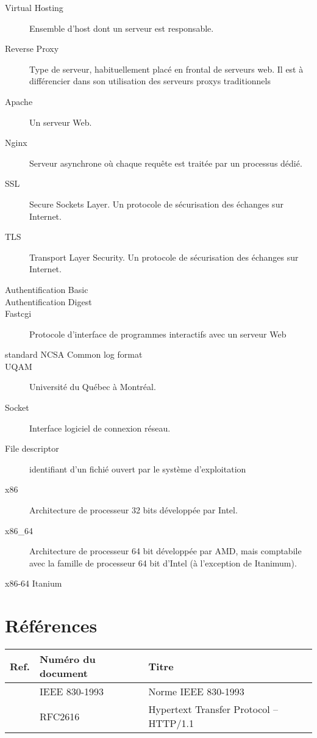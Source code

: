 \documentclass{scrreprt}
\begin{document}
\begin{description}
    \item[Virtual Hosting] Ensemble d'host dont un serveur est responsable.
    \item[Reverse Proxy] Type de serveur, habituellement placé en frontal de serveurs web. Il est à différencier dans son utilisation des serveurs proxys traditionnels
    \item[Apache] Un serveur Web.
    \item[Nginx] Serveur asynchrone où chaque requête est traitée par un processus dédié.
    \item[SSL] Secure Sockets Layer. Un protocole de sécurisation des échanges sur Internet.
    \item[TLS] Transport Layer Security. Un protocole de sécurisation des échanges sur Internet.
    \item[Authentification Basic]
    \item[Authentification Digest]
    \item[Fastcgi] Protocole d'interface de programmes interactifs avec un serveur Web 
    \item[standard NCSA Common log format]
    \item[UQAM] Université du Québec à Montréal.
    \item[Socket] Interface logiciel de connexion réseau.
    \item[File descriptor] identifiant d'un fichié ouvert par le système d'exploitation
    \item[x86] Architecture de processeur 32 bits développée par Intel.
    \item[x86_64] Architecture de processeur 64 bit développée par AMD, mais comptabile avec la famille de processeur 64 bit d'Intel (à l'exception de Itanimum).
    \item[x86-64 Itanium]
\end{description}

\section{Références}
\begin{tabularx}{\textwidth}{|l|X|l|}
    \hline
    Ref. & Numéro du document & Titre \\
    \hline
    \cite{ieefr} & IEEE 830-1993 & Norme IEEE 830-1993 \\
    \hline
    \cite{http} & RFC2616 & Hypertext Transfer Protocol -- HTTP/1.1 \\
    \hline
\end{tabularx}
\end{document}
